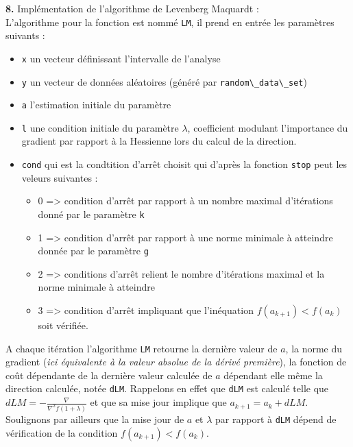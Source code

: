 \documentclass[12pt]{article}
\begin{document}
\textbf{\color{brick}8.} Implémentation de l'algorithme de Levenberg Maquardt :\\
L'algorithme pour la fonction est nommé \verb|LM|, il prend en entrée les paramètres suivants :
\begin{itemize}
    \item \verb|x| un vecteur définissant l'intervalle de l'analyse
    \item \verb|y| un vecteur de données aléatoires (généré par \verb|random\_data\_set|)
    \item \verb|a| l'estimation initiale du paramètre
    \item \verb|l| une condition initiale du paramètre $\lambda$, coefficient modulant l'importance du gradient par rapport à la Hessienne lors du calcul de la direction.
    \item\verb|cond| qui est la condtition d'arrêt choisit qui d'après la fonction \verb|stop| peut les veleurs suivantes :
    \begin{itemize}
        \item 0 => condition d'arrêt par  rapport à un nombre maximal d'itérations donné par le paramètre \verb|k|
        \item 1 => condition d'arrêt par rapport à une norme minimale à atteindre donnée par le paramètre \verb|g|
        \item 2 => conditions d'arrêt relient le nombre d'itérations maximal et la norme minimale à atteindre
        \item 3 => condition d'arrêt impliquant que l'inéquation $f(a_{k+1})<f(a_k)$ soit vérifiée.
    \end{itemize}
\end{itemize}
A chaque itération l'algorithme \verb|LM| retourne la dernière  valeur de  $a$, la norme du gradient (\textit{ici équivalente à la valeur absolue de la dérivé première}), la fonction de coût dépendante de la dernière valeur calculée de $a$ dépendant elle même la direction calculée, notée \verb|dLM|. Rappelons en effet que  \verb|dLM|  est calculé telle que $dLM = -\frac{\nabla}{\nabla^2 f (1 + \lambda)}$ et que sa mise jour implique que  $a_{k+1} = a_k +dLM$. Soulignons par ailleurs que la mise jour de $a$ et $\lambda$ par rapport à \verb|dLM| dépend de vérification  de la condition $f(a_{k+1}) < f(a_k)$.
\end{document}

